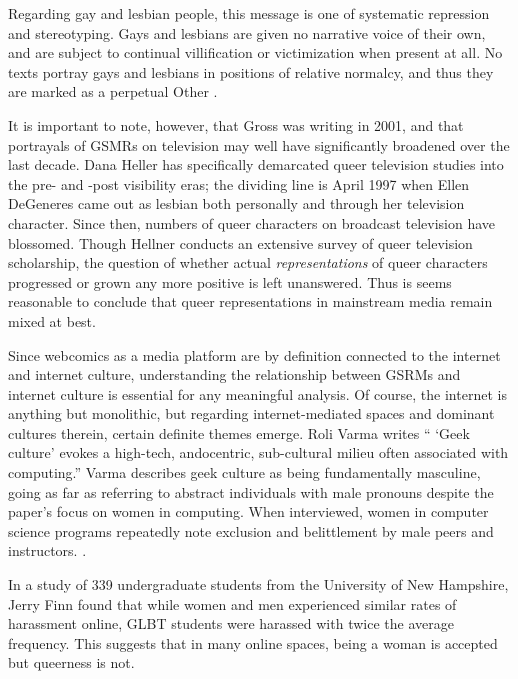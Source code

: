 \documentclass[man,12pt]{apa6}
\begin{document}
Regarding gay and lesbian people, this message is one of systematic repression and stereotyping. Gays and lesbians are given no narrative voice of their own, and are subject to continual villification or victimization when present at all. No texts portray gays and lesbians in positions of relative normalcy, and thus they are marked as a perpetual Other \cite{gross}.

It is important to note, however, that Gross was writing in 2001, and that portrayals of GSMRs on television may well have significantly broadened over the last decade. Dana Heller \citeyear{visibility} has specifically demarcated queer television studies into the pre- and -post visibility eras; the dividing line is April 1997 when Ellen DeGeneres came out as lesbian both personally and through her television character. Since then, numbers of queer characters on broadcast television have blossomed. Though Hellner conducts an extensive survey of queer television scholarship, the question of whether actual \emph{representations} of queer characters progressed or grown any more positive is left unanswered. Thus is seems reasonable to conclude that queer representations in mainstream media remain mixed at best.

Since webcomics as a media platform are by definition connected to the internet and internet culture, understanding the relationship between GSRMs and internet culture is essential for any meaningful analysis. Of course, the internet is anything but monolithic, but regarding internet-mediated spaces and dominant cultures therein, certain definite themes emerge. Roli Varma \citeyear{varma2007women} writes `` `Geek culture' evokes a high-tech, andocentric, sub-cultural milieu often associated with
computing.'' Varma describes geek culture as being fundamentally masculine, going as far as referring to abstract individuals with male pronouns despite the paper's focus on women in computing. When interviewed, women in computer science programs repeatedly note exclusion and belittlement by male peers and instructors. \cite{varma2007women}. 

In a study of 339 undergraduate students from the University of New Hampshire, Jerry Finn \citeyear{finn2004survey} found that while women and men experienced similar rates of harassment online, GLBT students were harassed with twice the average frequency. This suggests that in many online spaces, being a woman is accepted but queerness is not.
\end{document}
